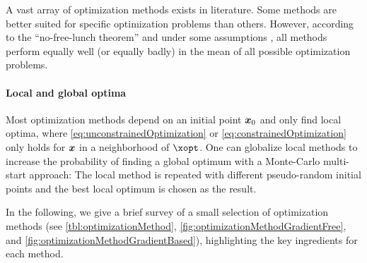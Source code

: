 A vast array of optimization methods exists in literature.
Some methods are better suited for specific optimization problems
than others.
However, according to the ``no-free-lunch theorem''
and under some assumptions \cite{Wolpert97No},
all methods perform equally well (or equally badly) in the mean of all possible
optimization problems.

\paragraph{Local and global optima}

Most optimization methods depend on an initial point ${\boldsymbol{x}}_0$ and
only find local optima,
where \eqref{eq:unconstrainedOptimization} or
\eqref{eq:constrainedOptimization} only holds for ${\boldsymbol{x}}$
in a neighborhood of $\xopt$.
One can globalize local methods to increase the probability
of finding a global optimum with a Monte-Carlo multi-start approach:
The local method is repeated with different pseudo-random initial points
and the best local optimum is chosen as the result.

In the following,
we give a brief survey of a small selection of optimization methods
(see
\cref{tbl:optimizationMethod},
\cref{fig:optimizationMethodGradientFree}, and
\cref{fig:optimizationMethodGradientBased}),
highlighting the key ingredients for each method.

